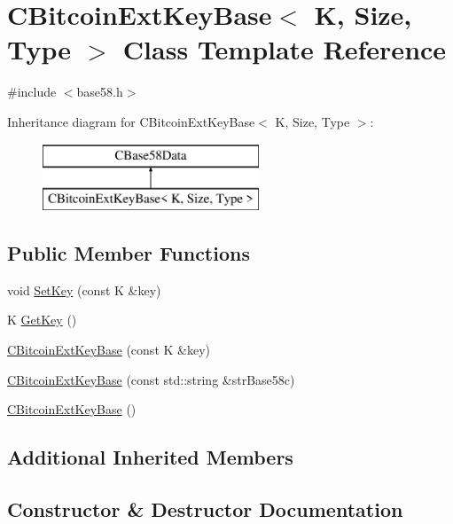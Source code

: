 \hypertarget{class_c_bitcoin_ext_key_base}{}\section{C\+Bitcoin\+Ext\+Key\+Base$<$ K, Size, Type $>$ Class Template Reference}
\label{class_c_bitcoin_ext_key_base}


{\ttfamily \#include $<$base58.\+h$>$}

Inheritance diagram for C\+Bitcoin\+Ext\+Key\+Base$<$ K, Size, Type $>$\+:\begin{figure}[H]
\begin{center}
\leavevmode
\includegraphics[height=2.000000cm]{class_c_bitcoin_ext_key_base}
\end{center}
\end{figure}
\subsection*{Public Member Functions}
\begin{DoxyCompactItemize}
\item 
void \mbox{\hyperlink{class_c_bitcoin_ext_key_base_aa6041045bb68b3f24d92f5e3b96aeef6}{Set\+Key}} (const K \&key)
\item 
K \mbox{\hyperlink{class_c_bitcoin_ext_key_base_a528399b89529212a44a08250c5f29d68}{Get\+Key}} ()
\item 
\mbox{\hyperlink{class_c_bitcoin_ext_key_base_a61b09dabc0849ba24520a78c5996096a}{C\+Bitcoin\+Ext\+Key\+Base}} (const K \&key)
\item 
\mbox{\hyperlink{class_c_bitcoin_ext_key_base_af377a86f3463504c0237546b777716ce}{C\+Bitcoin\+Ext\+Key\+Base}} (const std\+::string \&str\+Base58c)
\item 
\mbox{\hyperlink{class_c_bitcoin_ext_key_base_a0f4d52b23db0a0740c4519644e537565}{C\+Bitcoin\+Ext\+Key\+Base}} ()
\end{DoxyCompactItemize}
\subsection*{Additional Inherited Members}


\subsection{Constructor \& Destructor Documentation}
\mbox{\label{class_c_bitcoin_ext_key_base_a61b09dabc0849ba24520a78c5996096a}} 
